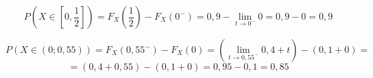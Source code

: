 \documentclass{article}
\begin{document}
\begin{equation*}
    P(X \in [0, \frac{1}{2}]) = F_{X}(\frac{1}{2}) - F_{X}(0^{-}) = 0,9 - \lim_{t \to 0^{-}} 0 = 0,9 - 0 = 0,9
\end{equation*}

\begin{equation*}
    P(X \in (0; 0,55)) = F_{X}(0,55^{-}) - F_{X}(0) = (\lim_{t \to 0,55^{-}} 0,4 + t) - (0,1 + 0) = 
\end{equation*}
\begin{equation*}
    = (0,4 + 0,55) - (0,1 + 0) = 0,95 - 0,1 = 0,85
\end{equation*}
\end{document}
